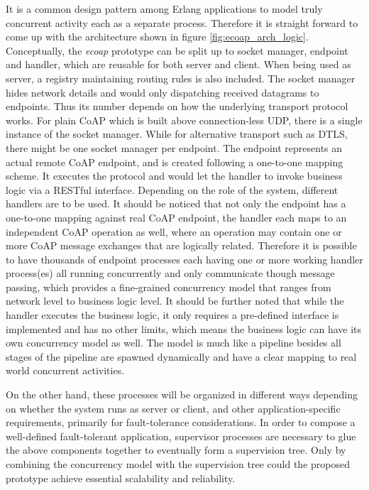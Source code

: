 It is a common design pattern among Erlang applications to model truly concurrent activity each as a separate process. Therefore it is straight forward to come up with the architecture shown in figure \ref{fig:ecoap_arch_logic}. Conceptually, the \textit{ecoap} prototype can be split up to socket manager, endpoint and handler, which are reusable for both server and client. When being used as server, a registry maintaining routing rules is also included. The socket manager hides network details and would only dispatching received datagrams to endpoints. Thus its number depends on how the underlying transport protocol works. For plain CoAP which is built above connection-less UDP, there is a single instance of the socket manager. While for alternative transport such as DTLS, there might be one socket manager per endpoint. The endpoint represents an actual remote CoAP endpoint, and is created following a one-to-one mapping scheme. It executes the protocol and would let the handler to invoke business logic via a RESTful interface. Depending on the role of the system, different handlers are to be used. It should be noticed that not only the endpoint has a one-to-one mapping against real CoAP endpoint, the handler each maps to an independent CoAP operation as well, where an operation may contain one or more CoAP message exchanges that are logically related. Therefore it is possible to have thousands of endpoint processes each having one or more working handler process(es) all running concurrently and only communicate though message passing, which provides a fine-grained concurrency model that ranges from network level to business logic level. It should be further noted that while the handler executes the business logic, it only requires a pre-defined interface is implemented and has no other limits, which means the business logic can have its own concurrency model as well. The model is much like a pipeline besides all stages of the pipeline are spawned dynamically and have a clear mapping to real world concurrent activities. 
 
On the other hand, these processes will be organized in different ways depending on whether the system runs as server or client, and other application-specific requirements, primarily for fault-tolerance considerations. In order to compose a well-defined fault-tolerant application, supervisor processes are necessary to glue the above components together to eventually form a supervision tree. Only by combining the concurrency model with the supervision tree could the proposed prototype achieve essential scalability and reliability. 

